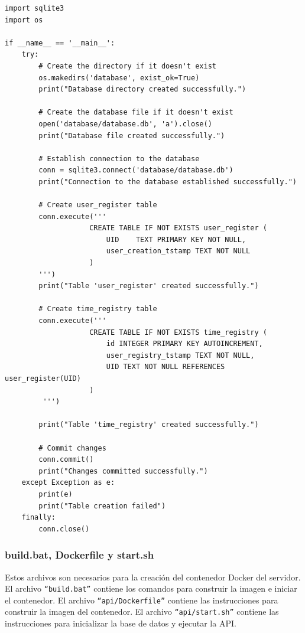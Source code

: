 \documentclass{article}
\begin{document}
\begin{lstlisting}
import sqlite3
import os

if __name__ == '__main__':
    try:
        # Create the directory if it doesn't exist
        os.makedirs('database', exist_ok=True)
        print("Database directory created successfully.")

        # Create the database file if it doesn't exist
        open('database/database.db', 'a').close()
        print("Database file created successfully.")

        # Establish connection to the database
        conn = sqlite3.connect('database/database.db')
        print("Connection to the database established successfully.")

        # Create user_register table
        conn.execute('''
                    CREATE TABLE IF NOT EXISTS user_register (
                        UID    TEXT PRIMARY KEY NOT NULL,
                        user_creation_tstamp TEXT NOT NULL
                    )
        ''')
        print("Table 'user_register' created successfully.")

        # Create time_registry table
        conn.execute('''
                    CREATE TABLE IF NOT EXISTS time_registry (
                        id INTEGER PRIMARY KEY AUTOINCREMENT,
                        user_registry_tstamp TEXT NOT NULL,
                        UID TEXT NOT NULL REFERENCES user_register(UID)
                    )
         ''')

        print("Table 'time_registry' created successfully.")

        # Commit changes
        conn.commit()
        print("Changes committed successfully.")
    except Exception as e:
        print(e)
        print("Table creation failed")
    finally:
        conn.close()

\end{lstlisting}

\subsubsection{build.bat, Dockerfile y start.sh}
Estos archivos son necesarios para la creación del contenedor Docker del servidor.
El archivo \texttt{``build.bat''} contiene los comandos para construir la imagen e iniciar el contenedor.
El archivo \texttt{``api/Dockerfile''} contiene las instrucciones para construir la imagen del contenedor.
El archivo \texttt{``api/start.sh''} contiene las instrucciones para inicializar la base de datos y ejecutar la API.
\end{document}
